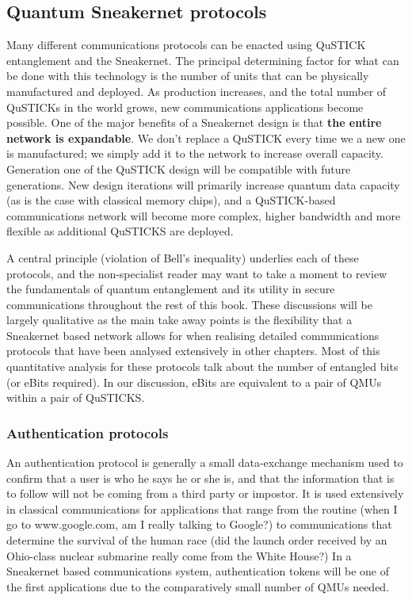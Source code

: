 \documentclass[twocolumn, aps, rmp, amsmath, amssymb, nofootinbib, superscriptaddress, longbibliography, floatfix, table-of-contents, eqsecnum]{revtex4-2}
\begin{document}
\subsection{Quantum Sneakernet protocols}

Many different communications protocols can be enacted using QuSTICK entanglement and the Sneakernet. The principal determining factor for what can be done with this technology is the number of units that can be physically manufactured and deployed. As production increases, and the total number of QuSTICKs in the world grows, new communications applications become possible. One of the major benefits of a Sneakernet design is that \textbf{the entire network is expandable}. We don't replace a QuSTICK every time we a new one is manufactured; we simply add it to the network to increase overall capacity. Generation one of the QuSTICK design will be compatible with future generations. New design iterations will primarily increase quantum data capacity (as is the case with classical memory chips), and a QuSTICK-based communications network will become more complex, higher bandwidth and more flexible as additional QuSTICKS are deployed. 

A central principle (violation of Bell's inequality) underlies each of these protocols, and the non-specialist reader may want to take a moment to review the fundamentals of quantum entanglement and its utility in secure communications throughout the rest of this book. These discussions will be largely qualitative as the main take away points is the flexibility that a Sneakernet based network allows for when realising detailed communications protocols that have been analysed extensively in other chapters. Most of this quantitative analysis for these protocols talk about the number of entangled bits (or eBits required). In our discussion, eBits are equivalent to a pair of QMUs within a pair of QuSTICKS. 

\subsubsection{Authentication protocols}

An authentication protocol is generally a small data-exchange mechanism used to confirm that a user is who he says he or she is, and that the information that is to follow will not be coming from a third party or impostor. It is used extensively in classical communications for applications that range from the routine (when I go to www.google.com, am I really talking to Google?) to communications that determine the survival of the human race (did the launch order received by an Ohio-class nuclear submarine really come from the White House?) In a Sneakernet based communications system, authentication tokens will be one of the first applications due to the comparatively small number of QMUs needed. 
\end{document}
